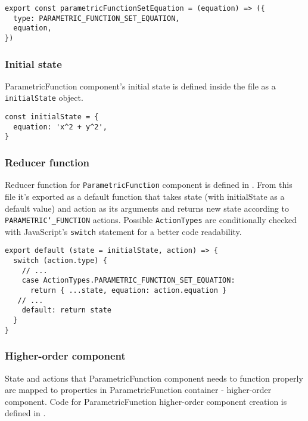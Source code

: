 \begin{lstlisting}[caption={Action for setting the function for 3D visualization.},captionpos=b]
export const parametricFunctionSetEquation = (equation) => ({
  type: PARAMETRIC_FUNCTION_SET_EQUATION,
  equation,
})
\end{lstlisting}

\subsubsection{Initial state}
ParametricFunction component's initial state is defined inside the   file as a \texttt{initialState} object.

\begin{lstlisting}[caption={Initial state of a \textsl{calculator}.},captionpos=b]
const initialState = {
  equation: 'x^2 + y^2',
}
\end{lstlisting}

\subsubsection{Reducer function}
Reducer function for \texttt{ParametricFunction} component is defined in . From this file it's exported as a default function that takes state (with initialState as a default value) and action as its arguments and returns new state according to \texttt{PARAMETRIC\char`_FUNCTION} actions. Possible \texttt{ActionTypes} are conditionally checked with JavaScript's \texttt{switch} statement for a better code readability.

\begin{lstlisting}[caption={Update the \texttt{state.parametricFunction.equation} value.},captionpos=b]
export default (state = initialState, action) => {
  switch (action.type) {
    // ...
    case ActionTypes.PARAMETRIC_FUNCTION_SET_EQUATION:
      return { ...state, equation: action.equation }
   // ...
    default: return state
  }
}
\end{lstlisting}

\subsubsection{Higher-order component}
State and actions that ParametricFunction component needs to function properly are mapped to properties in ParametricFunction container - higher-order component. Code for ParametricFunction higher-order component creation is defined in .

